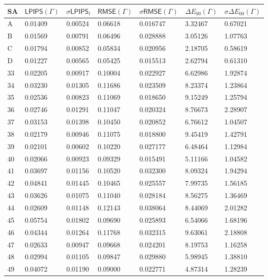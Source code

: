 	\begin{table}[H]
		\centering
		\begin{tabular}{|l|l|l|l|l|l|l|}
		\hline
		\textbf{SA}      &  $\mathsf{LPIPS}(\varGamma)$       & $\sigma \mathsf{LPIPS}_t$ & $\mathsf{RMSE}(\varGamma)$ & $\sigma \mathsf{RMSE}(\varGamma)$ & $\Delta E_{00}(\varGamma)$ & $ \sigma \Delta E_{00}(\varGamma)$\\
		\hline
		A  & 0.01409& 0.00524 & 0.06618& 0.016747 & 3.32467 & 0.67021\\
		B  & 0.01569& 0.00791 & 0.06496& 0.028888 & 3.05126 & 1.07763\\
		C  & 0.01794& 0.00852 & 0.05834& 0.020956 & 2.18705 & 0.58619\\
		D  & 0.01227& 0.00565 & 0.05425& 0.015513 & 2.62794 & 0.61310\\
		33 & 0.02205& 0.00917 & 0.10004& 0.022927 & 6.62986 & 1.92874\\
		34 & 0.03230& 0.01305 & 0.11686& 0.023509 & 8.23374 & 1.23864\\
		35 & 0.02536& 0.00823 & 0.11069& 0.018650 & 9.15249 & 1.25794\\
		36 & 0.02746& 0.01291 & 0.11047& 0.020324 & 8.76673 & 2.28907\\
		37 & 0.03153& 0.01398 & 0.10450& 0.020852 & 6.76612 & 1.04507\\
		38 & 0.02179& 0.00946 & 0.11075& 0.018800 & 9.45419 & 1.42791\\
		39 & 0.02101& 0.00602 & 0.10220& 0.027177 & 6.48464 & 1.12984\\
		40 & 0.02066& 0.00923 & 0.09329& 0.015491 & 5.11166 & 1.04582\\
		41 & 0.03697& 0.01156 & 0.10520& 0.032300 & 8.09324 & 1.94294\\
		42 & 0.04841& 0.01445 & 0.10465& 0.025557 & 7.99735 & 1.56185\\
		43 & 0.03626& 0.01075 & 0.11040& 0.028184 & 8.56275 & 1.36469\\
		44 & 0.02609& 0.01148 & 0.12143& 0.038064 & 8.44069 & 2.01282\\
		45 & 0.05754& 0.01802 & 0.09690& 0.025893 & 6.54066 & 1.68196\\
		46 & 0.04344& 0.01264 & 0.11768& 0.032315 & 9.63061 & 2.18808\\
		47 & 0.02633& 0.00947 & 0.09668& 0.024201 & 8.19753 & 1.16258\\
		48 & 0.02994& 0.01105 & 0.09847& 0.029880 & 5.98945 & 1.38810\\
		49 & 0.04072& 0.01190 & 0.09000& 0.022771 & 4.87314 & 1.28239\\

\end{tabular}
\end{table}
